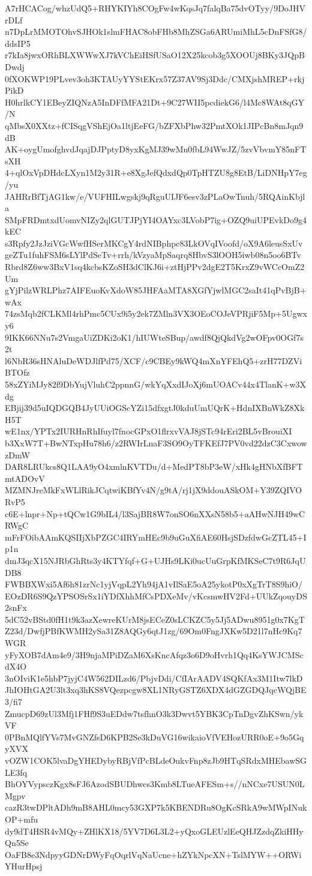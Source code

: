 A7rHCACog/whzUdQ5+RHYKIYh8COgFw4wKqsJq7falqBa75dvOTyy/9DoJHVrDLf
n7DpLrMMOTOhvSJHOk1slmFHAC8obFHb8MhZSGa6ARUmiMhL5cDnFSfG8/ddsIP5
r7kIa8jwxORhBLXWWwXJ7kVChEiHSfUSaO12X25kcob3g5XOOUj8BKy3JQpBDwdj
0fXOKWP19PLvev3oh3KTAUyYYStEKrx57Z37AV9Sj3Ddc/CMXjshMREP+rkjPikD
H0hrlkCY1EBeyZIQNzA5InDFfMFA21Dt+9C27WII5pcdiekG6/l4Mc8WAt8qGY/N
qMbsX0XXtz+fCISqgVShEjOa1ltjEeFG/bZFXbPhw32PmtXOk1JIPcBn8mJqn9dB
AK+oygUmofghvdJqajDJPptyD8yxKgMJ39wMu0fbL94WwJZ/5zvVbvmY85nFTsXH
4+qlOxVpDHdcLXyn1M2y31R+e8XgJefQdxdQp0TpHTZU8g8EtB/LiDNHpY7eg/yu
JAHRrBfTjAG1kw/e/VUFHILwgskj9qRguUIJF6esv3zPLaOwTnuh/5RQAinKbjla
SMpFRDmtxdUomvNIZy2qlGUTJPjYI4OAYxc3LVobP7ig+OZQ9uiUPEvkDo9g4kEC
s3Rpfy2JzJziVGcWwfHSerMKCgY4rdNIBphpc83LkOVqIVoofd/oX9A6leusSxUv
geZTu1fuhFSM6sLYlPdSeTv+rrh/kVzyaMpSaqrq8HbvS3lOOH5iwb08n5oo6BTv
Rbrd8Z6ww3BxV1sq4kcbsKZoSH3dClKJ6i+ztHjPPv2dgE2T5KrxZ9vWCcOmZ2Um
gYjPilzWRLPhz7AIFEuoKvXdoW85JHFAaMTA8XGfYjwlMGC2saIt41qPvBjB+wAx
74zsMqb2fCLKMl4rhPmc5CUx9i5y2ek7ZMln3VX3OEoCOJeVPRjiF5Mp+5Ugwxy6
9IKK66NNu7s2VmgaUiZDKi2oK1/hIUWteSBup/awdf8QjQkdVg2wOFpv0OGf7s2t
l6NbR36sHNAluDeWDJlfPd75/XCF/c9CBEy9kWQ4mXnYFEhQ5+zrH77DZViBTOfz
58xZYiMJy82f9DbYujVluhC2ppnnG/wkYqXxdIJoXj6mUOACv44x4TlanK+w3Xdg
EBjij39d5uIQDGQB4JyUUiOGScYZi15dfxgtJ0kduUmUQrK+HdnIXBnWkZ8XkH5T
wE1nx/YPTx2IURHnRhIfuyl7fnocGPxO1flrxvVAJ8jSTc94rEri2BL5vBrouiXI
b3XxW7T+BwNTxpHu78h6/z2RWIrLnaF3SO9OyTFKEfJ7PV0vd22dzC3CxwowzDmW
DAR8LRUkcs8Q1LAA9yO4xmlnKVTDu/d+MedPT8bP3eW/xHk4gHNbXfBFTmtADOvV
MZMNJreMkFxWLlRikJCqtwiKBfYv4N/g9tA/rj1jX9ddouASkOM+Y39ZQIVORvP5
c6E+lnpr+Np+tQCw1G9bIL4/l3SajBR8W7onSO6nXXsN58b5+aAHwNJH49wCRWgC
mFrFOibAAmKQSIIjXbPZGC4IRYmHEc9b9uGuXfiAE60HsjSDzfdwGcZTL45+Ip1n
dmJ3qcX15NJRbGhRts3y4KTYfqf+G+UJHs9LKi0ucUuGrpKfMKSeC7t9R6JqUDB8
FWBBXWxi5Af6h81zrNc1yjVqpL2Yh94jA1vIlSaE5oA25ykotP0xXgTrT8S9hiO/
EOzDR6S9QzYPSOSrSx1iYDfXhhMfCsPDXeMv/vKcsmwHV2Fd+UUkZqouyDS2snFx
5dC52vBStd0fH1t9k3azXewreKUrM8jsECeZ0sLCKZC5y5Jj5ADwu8951g0x7KgT
Z23d/DwfjPBfKWMH2ySa31Z8AQGy6qtJ1zg/69Om0FngJXKw5D21l7nHc9Kq7WGR
yFyXOB7dAm4e9/3H9njaMPiDZaM6XsKncAfqz3o6D9oHvrh1Qq4KsYWJCMScdX4O
3nOIviK1e5hbP7jyjC4W562DILzd6/PbjvDdi/CfIArAADV4SQKfAx3M1Itw7lkD
JhIOHtGA2U3lt3xq3hKS8VQezpcgw8XL1NRyGSTZ6XDX4dGZGDQJqcWQjBE3/fi7
ZmucpD69zUl3Mfj1FHf9S3uEDdw7tsfhnO3k3Dwvt5YBK3CpTnDgvZhKSwn/ykVF
0PBnMQlfYVs7MvGNZfsD6KPB2Se3kDuVG16wikaioVfVEHozURR0oE+9o5GqyXVX
vOZW1COK5lvaDgYHEDybyRBjVfPcBLdeOukvFnp8zJb9HTqSRdxMHEbawSGLE3fq
BhOYVypsczKgx8sFJ6AzodSBUDhwcs3Kmb8LTueAFESm+s//nNCxe7USUN0LMgpv
cazR3twDPltADh9mB8AHL0mcy53GXP7k5KBENDRu8OgKcSRkA9wMWpINukOP+mfu
dy9dT4HSR4vMQy+ZHlKX18/5YV7D6L3L2+yQxoGLEUzlEeQHJZzdqZkiHHyQn5Se
OaFB8e3NdpyyGDNrDWyFqOqrlVqNaUcne+hZYkNpcXN+TslMYW++ORWiYHurHpsj
